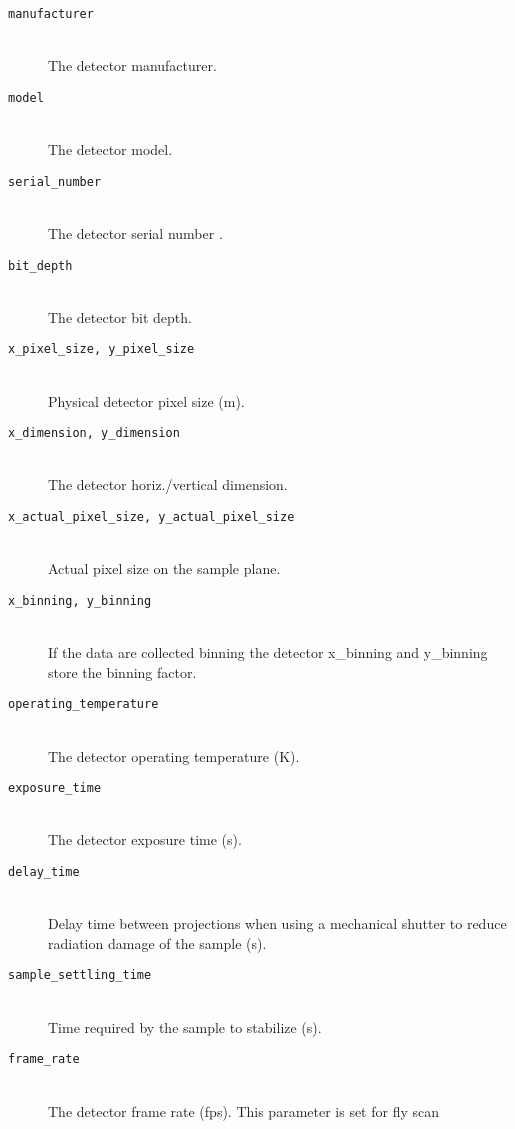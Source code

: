 \begin{description}
\item[\tt{manufacturer}] \hfill \\
{The detector manufacturer.}

\item[\tt{model}] \hfill \\
{The detector model.}

\item[\tt{serial\_number}] \hfill \\
{The detector serial number .}
     
\item[\tt{bit\_depth}] \hfill \\
{The detector bit depth.}

\item[\tt{x\_pixel\_size, y\_pixel\_size}] \hfill \\
{Physical detector pixel size (m).}

\item[\tt{x\_dimension, y\_dimension}] \hfill \\
{The detector horiz./vertical dimension.}

\item[\tt{x\_actual\_pixel\_size, y\_actual\_pixel\_size}] \hfill \\
{Actual pixel size on the sample plane.}


\item[\tt{x\_binning, y\_binning}] \hfill \\
{If the data are collected binning the detector x\_binning and y\_binning store the binning factor.}

\item[\tt{operating\_temperature}] \hfill \\
{The detector operating temperature (K).}

\item[\tt{exposure\_time}] \hfill \\
{The detector exposure time (s).}

\item[\tt{delay\_time}] \hfill \\
{Delay time between projections when using a mechanical shutter to reduce radiation damage of the sample (s).}

\item[\tt{sample\_settling\_time}] \hfill \\
{Time required by the sample to stabilize (s).}

\item[\tt{frame\_rate}] \hfill \\
{The detector frame rate (fps). This parameter is set for fly scan}


\end{description}
